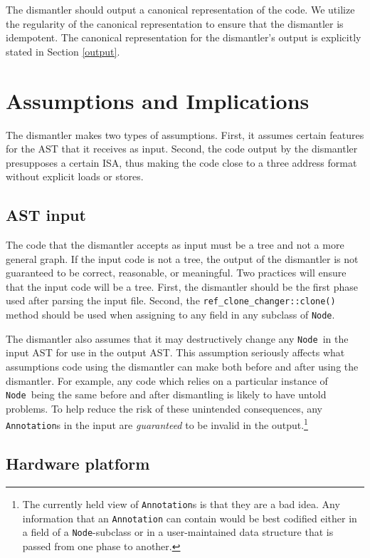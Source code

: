 \documentclass{article}
\newcommand{\node}{\texttt{Node}}
\begin{document}
The dismantler should output a canonical representation of the code.
We utilize the regularity of the canonical representation to ensure
that the dismantler is idempotent.  The canonical representation for
the dismantler's output is explicitly stated in Section
\ref{output}.

\section{\label{assume} Assumptions and Implications}

The dismantler makes two types of assumptions.  First, it assumes
certain features for the AST that it receives as input.  Second, the
code output by the dismantler presupposes a certain ISA, thus making
the code close to a three address format without explicit loads or
stores.

\subsection{\label{assume:ast} AST input}

The code that the dismantler accepts as input must be a tree and not a
more general graph.  If the input code is not a tree, the output of
the dismantler is not guaranteed to be correct, reasonable, or
meaningful.  Two practices will ensure that the input code will be a
tree.  First, the dismantler should be the first phase used after
parsing the input file.  Second, the
\texttt{ref\_clone\_changer::clone()} method should be used when
assigning to any field in any subclass of \node.

The dismantler also assumes that it may destructively change any
\node\ in the input AST for use in the output AST.  This assumption
seriously affects what assumptions code using the dismantler can make
both before and after using the dismantler.  For example, any code
which relies on a particular instance of \node\ being the same before
and after dismantling is likely to have untold problems.  To help
reduce the risk of these unintended consequences, any
\texttt{Annotation}s in the input are \emph{guaranteed} to be invalid
in the output.\footnote{The currently held view of
\texttt{Annotation}s is that they are a bad idea.  Any information
that an \texttt{Annotation} can contain would be best codified either
in a field of a \node-subclass or in a user-maintained data structure
that is passed from one phase to another.}

\subsection{\label{assume:hw} Hardware platform}
\end{document}
